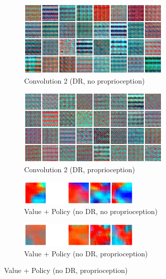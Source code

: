 \begin{figure}
  \begin{subfigure}{0.49\textwidth}
    \includegraphics[width=\textwidth]{figures/chapter6/act_max/fetch_dr_noprop_conv2}
    \caption{Convolution 2 (DR, no proprioception)}
  \end{subfigure}
  \begin{subfigure}{0.49\textwidth}
    \includegraphics[width=\textwidth]{figures/chapter6/act_max/fetch_dr_prop_conv2}
    \caption{Convolution 2 (DR, proprioception)}
  \end{subfigure}
  
  \begin{subfigure}{0.49\textwidth}
    \centering
    \includegraphics[width=0.63\textwidth]{figures/chapter6/act_max/fetch_nodr_noprop_value_policy}
    \caption{Value + Policy (no DR, no proprioception)}
  \end{subfigure}
  \begin{subfigure}{0.49\textwidth}
    \centering
    \includegraphics[width=0.63\textwidth]{figures/chapter6/act_max/fetch_nodr_prop_value_policy}
    \caption{Value + Policy (no DR, proprioception)}
  \end{subfigure}


\end{figure}

